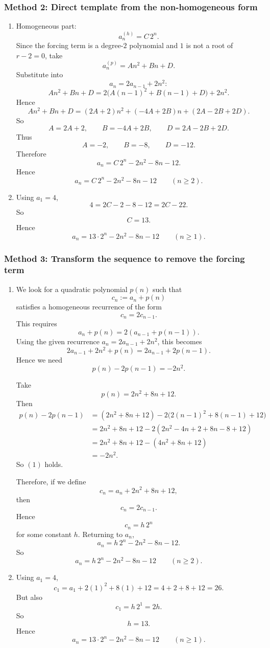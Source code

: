 \documentclass[12pt]{article}
\begin{document}
\newpage
\subsubsection{Method 2: Direct template from the non-homogeneous form}
\begin{enumerate}[label=(\alph*)]
\item Homogeneous part:
\[
a_n^{(h)}=C\,2^n.
\]
Since the forcing term is a degree-\(2\) polynomial and \(1\) is not a root of \(r-2=0\), take
\[
a_n^{(p)}=An^2+Bn+D.
\]
Substitute into
\[
a_n=2a_{n-1}+2n^2:
\]
\[
An^2+Bn+D
=
2\bigl(A(n-1)^2+B(n-1)+D\bigr)+2n^2.
\]
Hence
\[
An^2+Bn+D
=
(2A+2)n^2+(-4A+2B)n+(2A-2B+2D).
\]
So
\[
A=2A+2,\qquad B=-4A+2B,\qquad D=2A-2B+2D.
\]
Thus
\[
A=-2,\qquad B=-8,\qquad D=-12.
\]
Therefore
\[
a_n=C\,2^n-2n^2-8n-12.
\]
Hence
\[
\boxed{a_n=C\,2^n-2n^2-8n-12\qquad (n\ge 2).}
\]

\item Using \(a_1=4\),
\[
4=2C-2-8-12=2C-22.
\]
So
\[
C=13.
\]
Hence
\[
\boxed{a_n=13\cdot 2^n-2n^2-8n-12\qquad (n\ge 1).}
\]
\end{enumerate}

\newpage
\subsubsection{Method 3: Transform the sequence to remove the forcing term}
\begin{enumerate}[label=(\alph*)]
\item We look for a quadratic polynomial \(p(n)\) such that
\[
c_n:=a_n+p(n)
\]
satisfies a homogeneous recurrence of the form
\[
c_n=2c_{n-1}.
\]
This requires
\[
a_n+p(n)=2(a_{n-1}+p(n-1)).
\]
Using the given recurrence \(a_n=2a_{n-1}+2n^2\), this becomes
\[
2a_{n-1}+2n^2+p(n)=2a_{n-1}+2p(n-1).
\]
Hence we need
\[
p(n)-2p(n-1)=-2n^2. \tag{1}
\]

Take
\[
p(n)=2n^2+8n+12.
\]
Then
\begin{align*}
p(n)-2p(n-1)
&=(2n^2+8n+12)-2\bigl(2(n-1)^2+8(n-1)+12\bigr)\\
&=2n^2+8n+12-2(2n^2-4n+2+8n-8+12)\\
&=2n^2+8n+12-(4n^2+8n+12)\\
&=-2n^2.
\end{align*}
So \((1)\) holds.

Therefore, if we define
\[
c_n=a_n+2n^2+8n+12,
\]
then
\[
c_n=2c_{n-1}.
\]
Hence
\[
c_n=h\,2^n
\]
for some constant \(h\). Returning to \(a_n\),
\[
a_n=h\,2^n-2n^2-8n-12.
\]
So
\[
\boxed{a_n=h\,2^n-2n^2-8n-12\qquad (n\ge 2).}
\]

\item Using \(a_1=4\),
\[
c_1=a_1+2(1)^2+8(1)+12=4+2+8+12=26.
\]
But also
\[
c_1=h\,2^1=2h.
\]
So
\[
h=13.
\]
Hence
\[
\boxed{a_n=13\cdot 2^n-2n^2-8n-12\qquad (n\ge 1).}
\]
\end{enumerate}
\end{document}
